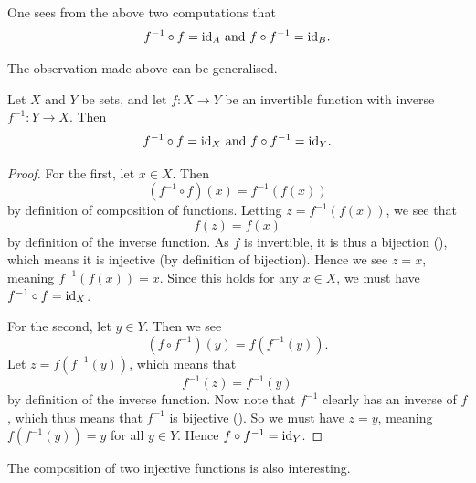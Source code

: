\begin{example}
    One sees from the above two computations that
    \[
        f^{-1} \circ f = \mathrm{id}_A \text{ and } f \circ f^{-1} = \mathrm{id}_B.
    \]
\end{example}

The observation made above can be generalised.

\begin{proposition}
    Let $X$ and $Y$ be sets, and let $f: X \to Y$ be an invertible function with inverse $f^{-1}: Y \to X$. Then
    \[
        f^{-1} \circ f = \mathrm{id}_X \text{ and } f \circ f^{-1} = \mathrm{id}_Y.
    \]
\end{proposition}
\begin{proof}
    For the first, let $x \in X$. Then
    \[
        (f^{-1} \circ f)(x) = f^{-1}(f(x))
    \]
    by definition of composition of functions. Letting $z = f^{-1}(f(x))$, we see that
    \[
        f(z) = f(x)
    \]
    by definition of the inverse function. As $f$ is invertible, it is thus a bijection (), which means it is injective (by definition of bijection). Hence we see $z = x$, meaning $f^{-1}(f(x)) = x$. Since this holds for any $x \in X$, we must have $f^{-1} \circ f = \mathrm{id}_X$.

    For the second, let $y \in Y$. Then we see
    \[
        (f \circ f^{-1})(y) = f(f^{-1}(y)).
    \]
    Let $z = f(f^{-1}(y))$, which means that
    \[
        f^{-1}(z) = f^{-1}(y)
    \]
    by definition of the inverse function. Now note that $f^{-1}$ clearly has an inverse of $f$, which thus means that $f^{-1}$ is bijective (). So we must have $z = y$, meaning $f(f^{-1}(y)) = y$ for all $y \in Y$. Hence $f \circ f^{-1} = \mathrm{id}_Y$.
\end{proof}

The composition of two injective functions is also interesting.

